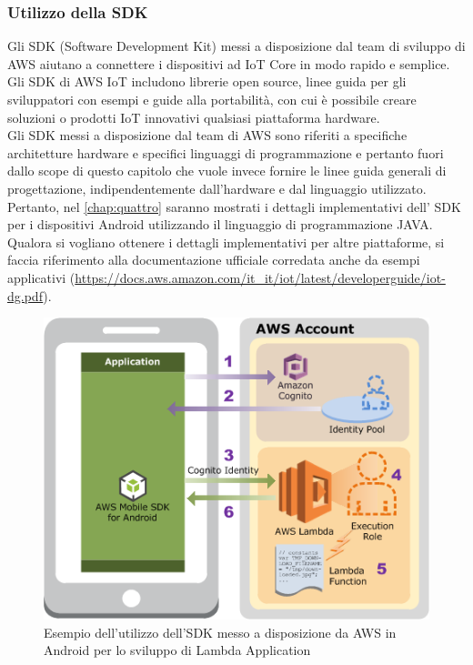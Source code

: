 \subsubsection{Utilizzo della SDK}
Gli SDK (Software Development Kit) messi a disposizione dal team di sviluppo di AWS aiutano a connettere i dispositivi ad IoT Core in modo rapido e semplice.
Gli SDK di AWS IoT includono librerie open source, linee guida per gli
sviluppatori con esempi e guide alla portabilità, con cui è possibile creare soluzioni o prodotti IoT innovativi qualsiasi piattaforma hardware.\\
Gli SDK messi a disposizione dal team di AWS sono riferiti a specifiche architetture hardware e specifici linguaggi di programmazione e pertanto fuori dallo scope di questo capitolo che vuole invece fornire le linee guida generali di progettazione, indipendentemente dall'hardware e dal linguaggio utilizzato. Pertanto, nel \autoref{chap:quattro} saranno mostrati i dettagli implementativi dell' SDK per i dispositivi Android utilizzando il linguaggio di programmazione JAVA. \\
Qualora si vogliano ottenere i dettagli implementativi per altre piattaforme, si faccia riferimento alla documentazione ufficiale corredata anche da esempi applicativi (\url{https://docs.aws.amazon.com/it_it/iot/latest/developerguide/iot-dg.pdf}).
\begin{figure}
	\begin{center}
		\includegraphics[width=0.5\columnwidth]{images/android_sdk}
	\end{center}
	\caption{Esempio dell'utilizzo dell'SDK messo a disposizione da AWS in Android per lo sviluppo di Lambda Application}
	\label{fig:android_sdk}
\end{figure}

